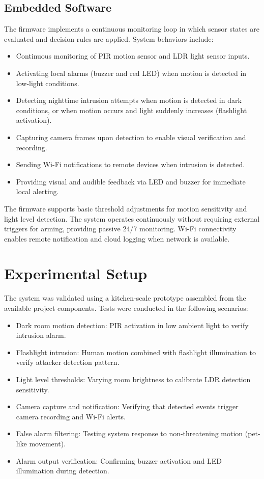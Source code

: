 \documentclass[conference]{IEEEtran}
\begin{document}
\subsection{Embedded Software}
The firmware implements a continuous monitoring loop in which sensor states are evaluated and decision rules are applied. System behaviors include:
\begin{itemize}
  \item Continuous monitoring of PIR motion sensor and LDR light sensor inputs.
  \item Activating local alarms (buzzer and red LED) when motion is detected in low-light conditions.
  \item Detecting nighttime intrusion attempts when motion is detected in dark conditions, or when motion occurs and light suddenly increases (flashlight activation).
  \item Capturing camera frames upon detection to enable visual verification and recording.
  \item Sending Wi-Fi notifications to remote devices when intrusion is detected.
  \item Providing visual and audible feedback via LED and buzzer for immediate local alerting.
\end{itemize}

The firmware supports basic threshold adjustments for motion sensitivity and light level detection. The system operates continuously without requiring external triggers for arming, providing passive 24/7 monitoring. Wi-Fi connectivity enables remote notification and cloud logging when network is available.

\section{Experimental Setup}
The system was validated using a kitchen-scale prototype assembled from the available project components. Tests were conducted in the following scenarios:
\begin{itemize}
  \item Dark room motion detection: PIR activation in low ambient light to verify intrusion alarm.
  \item Flashlight intrusion: Human motion combined with flashlight illumination to verify attacker detection pattern.
  \item Light level thresholds: Varying room brightness to calibrate LDR detection sensitivity.
  \item Camera capture and notification: Verifying that detected events trigger camera recording and Wi-Fi alerts.
  \item False alarm filtering: Testing system response to non-threatening motion (pet-like movement).
  \item Alarm output verification: Confirming buzzer activation and LED illumination during detection.
\end{itemize}
\end{document}
